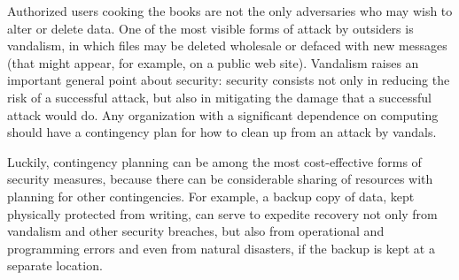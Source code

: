 Authorized users cooking the books are not the only adversaries who
may wish to alter or delete data.  One of the most visible forms of
attack by outsiders is vandalism, in which files may be deleted
wholesale or defaced with new messages (that might appear, for example, on a public web site).  Vandalism
raises an important general point about security: security consists
not only in reducing the risk of a successful attack, but also in
mitigating the damage that a successful attack would do.  Any
organization with a significant dependence on computing should have a
contingency plan for how to clean up from an attack by vandals.

Luckily, contingency planning can be among the most cost-effective
forms of security measures, because there can be considerable sharing
of resources with planning for other contingencies.  For example, a
backup copy of data, kept physically protected from writing, can serve
to expedite recovery not only from vandalism and other security
breaches, but also from operational and programming errors and even
from natural disasters, if the backup is kept at a separate location.

